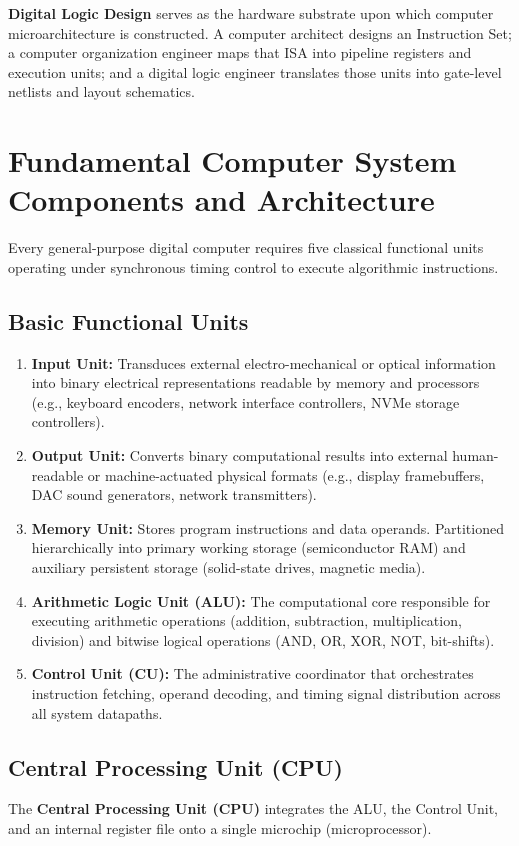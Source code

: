 \textbf{Digital Logic Design} serves as the hardware substrate upon which computer microarchitecture is constructed. A computer architect designs an Instruction Set; a computer organization engineer maps that ISA into pipeline registers and execution units; and a digital logic engineer translates those units into gate-level netlists and layout schematics.


\section{Fundamental Computer System Components and Architecture}
\label{sec:system_components}

Every general-purpose digital computer requires five classical functional units operating under synchronous timing control to execute algorithmic instructions.

\subsection{Basic Functional Units}
\begin{enumerate}[label=\bfseries\alph*.]
    \item \textbf{Input Unit:} Transduces external electro-mechanical or optical information into binary electrical representations readable by memory and processors (e.g., keyboard encoders, network interface controllers, NVMe storage controllers).
    \item \textbf{Output Unit:} Converts binary computational results into external human-readable or machine-actuated physical formats (e.g., display framebuffers, DAC sound generators, network transmitters).
    \item \textbf{Memory Unit:} Stores program instructions and data operands. Partitioned hierarchically into primary working storage (semiconductor RAM) and auxiliary persistent storage (solid-state drives, magnetic media).
    \item \textbf{Arithmetic Logic Unit (ALU):} The computational core responsible for executing arithmetic operations (addition, subtraction, multiplication, division) and bitwise logical operations (AND, OR, XOR, NOT, bit-shifts).
    \item \textbf{Control Unit (CU):} The administrative coordinator that orchestrates instruction fetching, operand decoding, and timing signal distribution across all system datapaths.
\end{enumerate}

\subsection{Central Processing Unit (CPU)}
The \textbf{Central Processing Unit (CPU)} integrates the ALU, the Control Unit, and an internal register file onto a single microchip (microprocessor).

